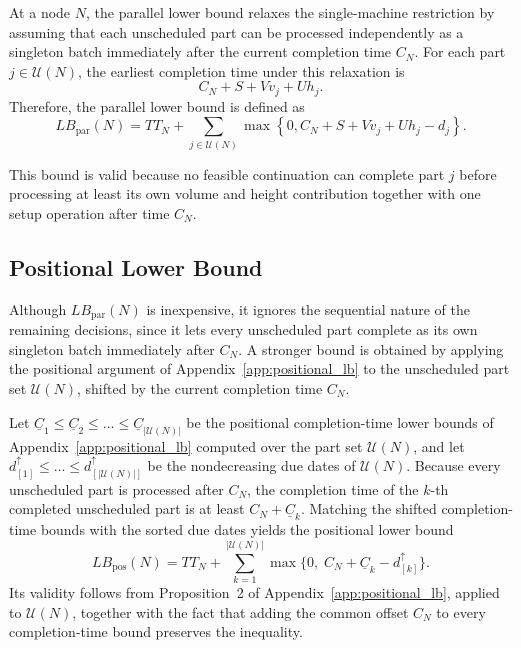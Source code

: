 \documentclass[letterpaper, 10 pt, conference]{ieeeconf}  %
\begin{document}
At a node $N$, the parallel lower bound relaxes the single-machine
restriction by assuming that each unscheduled part can be processed
independently as a singleton batch immediately after the current completion
time $C_N$. For each part $j\in\mathcal{U}(N)$, the earliest completion time
under this relaxation is
\begin{equation}
	C_N+S+Vv_j+Uh_j .
\end{equation}
Therefore, the parallel lower bound is defined as
\begin{equation}
	LB_{\mathrm{par}}(N)
	=
	TT_N
	+
	\sum_{j\in\mathcal{U}(N)}
	\max
	\left\{
	0,
	C_N+S+Vv_j+Uh_j-d_j
	\right\}.
	\label{eq:oracle_lb_par}
\end{equation}

This bound is valid because no feasible continuation can complete part $j$
before processing at least its own volume and height contribution together
with one setup operation after time $C_N$.

\subsection{Positional Lower Bound}

Although $LB_{\mathrm{par}}(N)$ is inexpensive, it ignores the sequential
nature of the remaining decisions, since it lets every unscheduled part
complete as its own singleton batch immediately after $C_N$. A stronger bound
is obtained by applying the positional argument of
Appendix~\ref{app:positional_lb} to the unscheduled part set
$\mathcal{U}(N)$, shifted by the current completion time $C_N$.

Let
$\underline{C}_1\le\underline{C}_2\le\dots\le\underline{C}_{|\mathcal{U}(N)|}$
be the positional completion-time lower bounds of
Appendix~\ref{app:positional_lb} computed over the part set $\mathcal{U}(N)$,
and let
$d^{\uparrow}_{[1]}\le\dots\le d^{\uparrow}_{[|\mathcal{U}(N)|]}$ be the
nondecreasing due dates of $\mathcal{U}(N)$. Because every unscheduled part is
processed after $C_N$, the completion time of the $k$-th completed unscheduled
part is at least $C_N+\underline{C}_k$. Matching the shifted completion-time
bounds with the sorted due dates yields the positional lower bound
\begin{equation}
	LB_{\mathrm{pos}}(N)
	=
	TT_N
	+
	\sum_{k=1}^{|\mathcal{U}(N)|}
	\max\bigl\{0,\;C_N+\underline{C}_k-d^{\uparrow}_{[k]}\bigr\}.
	\label{eq:oracle_lb_pos}
\end{equation}
Its validity follows from Proposition~2 of Appendix~\ref{app:positional_lb},
applied to $\mathcal{U}(N)$, together with the fact that adding the common
offset $C_N$ to every completion-time bound preserves the inequality.
\end{document}

